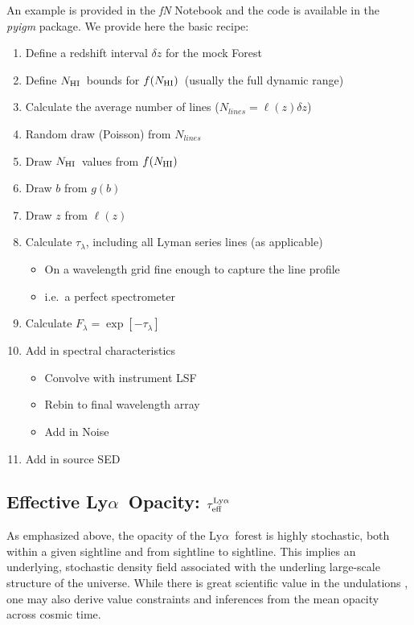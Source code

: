 \documentclass[graybox]{svmult}
\def\lya{Ly$\alpha$}
\newcommand{\mnhi}{N_{\rm HI}}
\newcommand{\nhi}{$\mnhi$}
\def\mfnhi{f(\mnhi)}
\def\fnhi{$\mfnhi$}
\begin{document}
An example is provided in the {\it fN} Notebook and the
code is available in the {\it pyigm} package.  We provide
here the basic recipe:

\begin{enumerate}
		\item Define a redshift interval $\delta z$ for the mock Forest
		\item Define \nhi\ bounds for \fnhi\ (usually the full dynamic range)
		\item Calculate the average number of lines 
		($N_{lines} = \ell(z) \delta z$)
		\item Random draw (Poisson) from $N_{lines}$
		\item Draw \nhi\ values from \fnhi
		\item Draw $b$ from $g(b)$
		\item Draw $z$ from $\ell(z)$
		\item Calculate $\tau_\lambda$, including all 
		Lyman series lines (as applicable)
			\begin{itemize}
			\item On a wavelength grid fine enough to 
			capture the line profile
			\item i.e.\ a perfect spectrometer
			\end{itemize}
		\item Calculate $F_\lambda = \exp[-\tau_\lambda]$
		\item Add in spectral characteristics
			\begin{itemize}
			\item Convolve with instrument LSF
			\item Rebin to final wavelength array
			\item Add in Noise
			\end{itemize}
		\item Add in source SED
\end{enumerate}

\subsection{Effective \lya\ Opacity: $\tau_{\rm eff}^{\rm Ly\alpha}$}
\label{sec:teff_lya}
As emphasized above, the opacity of the \lya\ forest
is highly stochastic, both within a given sightline and
from sightline to sightline.
This implies an underlying, stochastic density field
associated with the underling large-scale structure of the
universe.  While there is great scientific value in the
undulations \cite[e.g.]{lee+15}, one may also derive
value constraints and inferences from the mean opacity across
cosmic time.  
\end{document}
